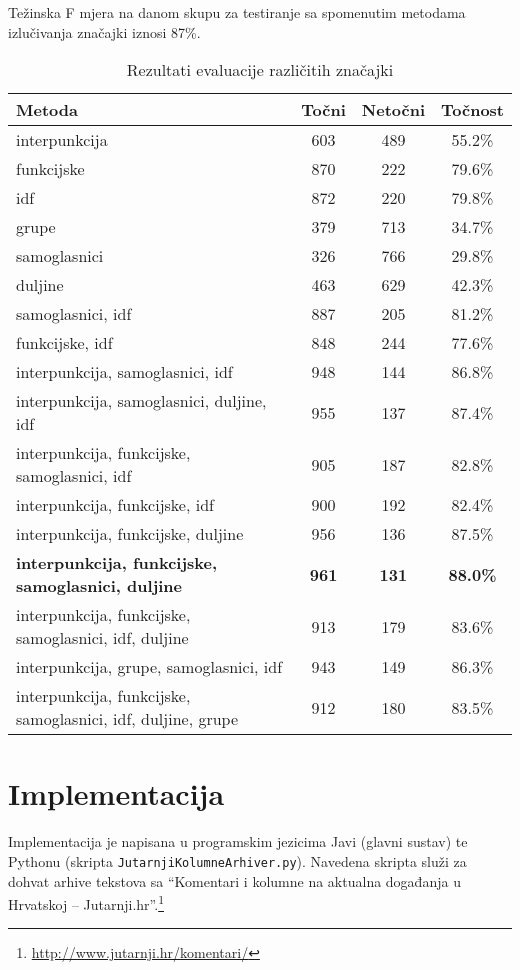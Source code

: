 \documentclass{article}
\begin{document}
Težinska F mjera na danom skupu za testiranje sa spomenutim metodama
izlučivanja značajki iznosi 87\%.

\begin{table}[ht]
\caption{Rezultati evaluacije različitih značajki}
\centering
\begin{tabular}{p{6cm} c c c}
\hline\hline
Metoda & Točni & Netočni & Točnost \\
[0.5ex]
\hline
interpunkcija & 603 & 489 & 55.2\% \\
funkcijske & 870 & 222 & 79.6\% \\
idf & 872 & 220 & 79.8\% \\
grupe & 379 & 713 & 34.7\% \\
samoglasnici & 326 & 766 & 29.8\% \\
duljine & 463 & 629 & 42.3\% \\
samoglasnici, idf & 887 & 205 & 81.2\% \\
funkcijske, idf & 848 & 244 & 77.6\% \\
interpunkcija, samoglasnici, idf & 948 & 144 & 86.8\% \\
interpunkcija, samoglasnici, duljine, idf & 955 & 137 & 87.4\% \\
interpunkcija, funkcijske, samoglasnici, idf & 905 & 187 & 82.8\% \\
interpunkcija, funkcijske, idf & 900 & 192 & 82.4\% \\
interpunkcija, funkcijske, duljine & 956 & 136 & 87.5\% \\
\textbf{interpunkcija, funkcijske, samoglasnici, duljine} & \textbf{961} & \textbf{131} & \textbf{88.0\%} \\
interpunkcija, funkcijske, samoglasnici, idf, duljine & 913 & 179 & 83.6\% \\
interpunkcija, grupe, samoglasnici, idf & 943 & 149 & 86.3\% \\
interpunkcija, funkcijske, samoglasnici, idf, duljine, grupe & 912 & 180 & 83.5\% \\ [1ex]
\hline
\end{tabular}
\label{tbl:eval}
\end{table}

\section{Implementacija}
\label{sec:implementacija}
Implementacija je napisana u programskim jezicima Javi (glavni sustav) te
Pythonu (skripta \texttt{JutarnjiKolumneArhiver.py}). Navedena skripta služi za
dohvat arhive tekstova sa ``Komentari i kolumne na aktualna događanja u
Hrvatskoj -- Jutarnji.hr''.\footnote{\url{http://www.jutarnji.hr/komentari/}}
\end{document}
